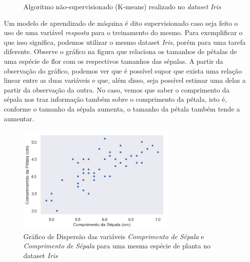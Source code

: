 \begin{figure}[!htb]
    \caption{\label{fig:iris} Algoritmo não-supervisionado (K-means) realizado no \textit{dataset Iris} }
  \end{figure}

Um modelo de aprendizado de máquina é dito supervisionado caso seja feito o uso de uma variável \textit{resposta} para o treinamento do mesmo. Para exemplificar o que isso significa, podemos utilizar o mesmo dataset \textit{Iris}, porém para uma tarefa diferente. Observe o gráfico na figura que relaciona os tamanhos de pétalas de uma espécie de flor com os respectivos tamanhos das sépalas. A partir da observação do gráfico, podemos ver que é possível supor que exista uma relação linear entre as duas variáveis e que, além disso, seja possível estimar uma delas a partir da observação da outra. No caso, vemos que saber o comprimento da sépala nos traz informação também sobre o comprimento da pétala, isto é, conforme o tamanho da sépala aumenta, o tamanho da pétala também tende a aumentar. 

\begin{figure}[H]
    \centering
    \includegraphics[width=0.7\textwidth]{img/iris_linear.png}
    \caption{Gráfico de Dispersão das variáveis \textit{Comprimento de Sépala} e \textit{Comprimento de Sépala} para uma mesma espécie de planta no dataset \textit{Iris}}
    \label{fig:my_label}
\end{figure}

